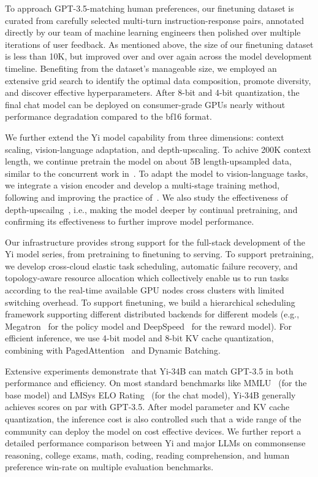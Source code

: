 \documentclass[numbers,sort&compress]{article}
\begin{document}
To approach GPT-3.5-matching human preferences, our finetuning dataset is curated from carefully selected multi-turn instruction-response pairs, annotated directly by our team of machine learning engineers then polished over multiple iterations of user feedback.
As mentioned above, the size of our finetuning dataset is less than 10K, but improved over and over again across the model development timeline. 
Benefiting from the dataset's manageable size, we employed an extensive grid search to identify the optimal data composition, promote diversity, and discover effective hyperparameters. 
After 8-bit and 4-bit quantization, the final chat model can be deployed on consumer-grade GPUs nearly without performance degradation compared to the bf16 format.

We further extend the Yi model capability from three dimensions: context scaling, vision-language adaptation, and depth-upscaling. 
To achive 200K context length, we continue pretrain the model on about 5B length-upsampled data, similar to the concurrent work in~\citet{fu2024data}. 
To adapt the model to vision-language tasks, we integrate a vision encoder and develop a multi-stage training method, following and improving the practice of~\citet{liu2023visual}. 
We also study the effectiveness of depth-upscailng~\citep{kim2023solar}, i.e., making the model deeper by continual pretraining, and confirming its effectiveness to further improve model performance.

Our infrastructure provides strong support for the full-stack development of the Yi model series, from pretraining to finetuning to serving. 
To support pretraining, we develop cross-cloud elastic task scheduling, automatic failure recovery, and topology-aware resource allocation which collectively enable us to run tasks according to the real-time available GPU nodes cross clusters with limited switching overhead. 
To support finetuning, we build a hierarchical scheduling framework supporting different distributed backends for different models (e.g., Megatron~\citep{megatron-lm} for the policy model and DeepSpeed~\citep{zero} for the reward model). 
For efficient inference, we use 4-bit model and 8-bit KV cache quantization, combining with PagedAttention~\citep{kwon2023efficient} and Dynamic Batching. 

Extensive experiments demonstrate that Yi-34B can match GPT-3.5 in both performance and efficiency. 
On most standard benchmarks like MMLU~\citep{hendrycks2020measuring} (for the base model) and LMSys ELO Rating~\citep{zheng2023judging} (for the chat model), Yi-34B generally achieves scores on par with GPT-3.5. 
After model parameter and KV cache quantization, the inference cost is also controlled such that a wide range of the community can deploy the model on cost effective devices. 
We further report a detailed performance comparison between Yi and major LLMs on commonsense reasoning, college exams, math, coding, reading comprehension, and human preference win-rate on multiple evaluation benchmarks. 
\end{document}
